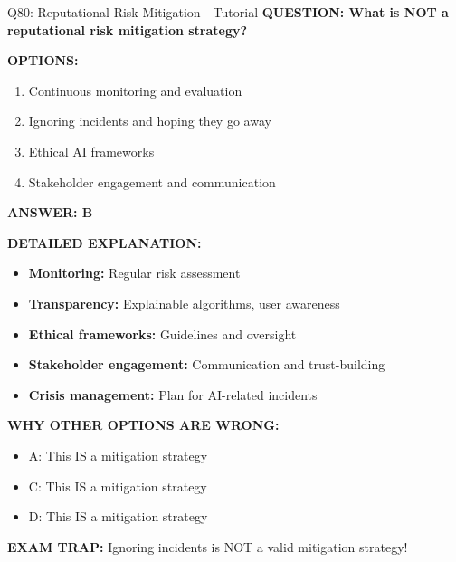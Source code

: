 \documentclass[8pt]{beamer}
\begin{document}
	\begin{frame}{Q80: Reputational Risk Mitigation - Tutorial}
		\fontsize{6.5}{7.5}\selectfont
		\textbf{QUESTION: What is NOT a reputational risk mitigation strategy?}
		
		\vspace{0.1cm}
		\textbf{OPTIONS:}
		\begin{enumerate}
			\item Continuous monitoring and evaluation
			\item Ignoring incidents and hoping they go away
			\item Ethical AI frameworks
			\item Stakeholder engagement and communication
		\end{enumerate}
		
		\vspace{0.1cm}
		\textcolor{myblue}{\textbf{ANSWER: B}}
		
		\vspace{0.1cm}
		\textbf{DETAILED EXPLANATION:}
		\begin{itemize}
			\item \textbf{Monitoring:} Regular risk assessment
			\item \textbf{Transparency:} Explainable algorithms, user awareness
			\item \textbf{Ethical frameworks:} Guidelines and oversight
			\item \textbf{Stakeholder engagement:} Communication and trust-building
			\item \textbf{Crisis management:} Plan for AI-related incidents
		\end{itemize}
		
		\vspace{0.1cm}
		\textcolor{myred}{\textbf{WHY OTHER OPTIONS ARE WRONG:}}
		\begin{itemize}
			\item \textcolor{myred}{A:} This IS a mitigation strategy
			\item \textcolor{myred}{C:} This IS a mitigation strategy
			\item \textcolor{myred}{D:} This IS a mitigation strategy
		\end{itemize}
		
		\textcolor{myred}{\textbf{EXAM TRAP:}} Ignoring incidents is \textcolor{myblue}{NOT a valid mitigation strategy}!
	\end{frame}
	
	
\end{document}
